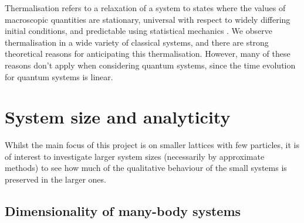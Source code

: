 \documentclass[prb, twocolumn, final]{revtex4-1}
\theoremstyle{plain}
\begin{document}
Thermalisation refers to a relaxation of a system to states where the values
of macroscopic quantities are stationary, universal with respect to widely
differing initial conditions, and predictable using statistical mechanics
\cite{Rigol2008}. We observe thermalisation in a wide variety of classical
systems, and there are strong theoretical reasons for anticipating this
thermalisation. However, many of these reasons don't apply when considering
quantum systems, since the time evolution for quantum systems is linear.

\newpage
\section{System size and analyticity}

Whilst the main focus of this project is on smaller lattices with few particles,
it is of interest to investigate larger system sizes (necessarily by approximate
methods) to see how much of the qualitative behaviour of the small systems is
preserved in the larger ones.

\subsection{Dimensionality of many-body systems}
\end{document}
